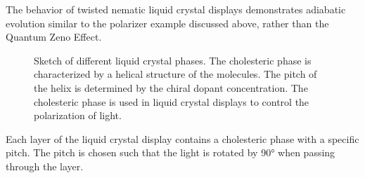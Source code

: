 \documentclass[
  a4paper,
]{book}
\begin{document}
The behavior of twisted nematic liquid crystal displays demonstrates
adiabatic evolution similar to the polarizer example discussed above,
rather than the Quantum Zeno Effect.

\begin{figure}


\caption{\label{fig-zeno}Sketch of different liquid crystal phases. The
cholesteric phase is characterized by a helical structure of the
molecules. The pitch of the helix is determined by the chiral dopant
concentration. The cholesteric phase is used in liquid crystal displays
to control the polarization of light.}

\end{figure}%

Each layer of the liquid crystal display contains a cholesteric phase
with a specific pitch. The pitch is chosen such that the light is
rotated by 90° when passing through the layer.
\end{document}
